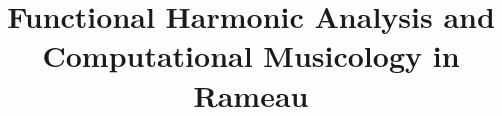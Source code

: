 \documentclass[12pt]{article}
\title{Functional Harmonic Analysis and Computational Musicology in Rameau}
\author{}
\begin{document}
\maketitle

\begin{abstract}

\end{abstract}





\end{document}
